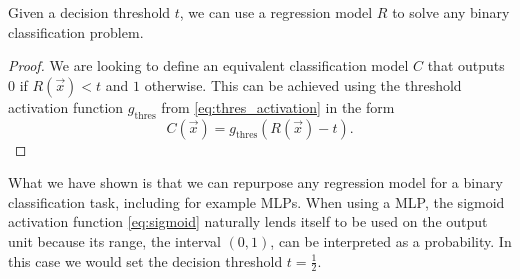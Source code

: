 \begin{lemma}
    Given a decision threshold $t$, we can use a regression model $R$ to solve any binary classification problem.
\end{lemma}
\begin{proof}
    We are looking to define an equivalent classification model $C$ that outputs $0$ if $R\left(\vec{x}\right)<t$ and $1$ otherwise. 
    This can be achieved using the threshold activation function $g_\text{thres}$ from \ref{eq:thres_activation} in the form
    \begin{equation}
        C(\vec{x}) = g_\text{thres}\left(R\left(\vec{x}\right) - t\right).
    \end{equation}
\end{proof}
\begin{remark}
    What we have shown is that we can repurpose any regression model for a binary classification task, including for example MLPs.
    When using a MLP, the sigmoid activation function \ref{eq:sigmoid} naturally lends itself to be used on the output unit because its range, the interval $(0,1)$, can be interpreted as a probability.
    In this case we would set the decision threshold $t=\frac{1}{2}$.
\end{remark}

